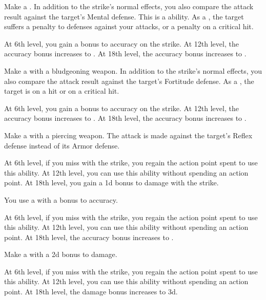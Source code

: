 {             Make a .
            In addition to the strike's normal effects, you also compare the attack result against the target's Mental defense.
            This is a  ability.
            As a , the target suffers a  penalty to defenses against your attacks, or a  penalty on a critical hit.
            \par At 6th level, you gain a  bonus to accuracy on the strike.
            At 12th level, the accuracy bonus increases to .
            At 18th level, the accuracy bonus increases to .

             Make a  with a bludgeoning weapon.
            In addition to the strike's normal effects, you also compare the attack result against the target's Fortitude defense.
            As a , the target is \sickened on a hit or \nauseated on a critical hit.
            \par At 6th level, you gain a  bonus to accuracy on the strike.
            At 12th level, the accuracy bonus increases to .
            At 18th level, the accuracy bonus increases to .

             Make a  with a piercing weapon.
            The attack is made against the target's Reflex defense instead of its Armor defense.
            \par At 6th level, if you miss with the strike, you regain the action point spent to use this ability.
            At 12th level, you can use this ability without spending an action point.
            At 18th level, you gain a \plus1d bonus to damage with the strike.

             You use a  with a  bonus to accuracy.
            \par At 6th level, if you miss with the strike, you regain the action point spent to use this ability.
            At 12th level, you can use this ability without spending an action point.
            At 18th level, the accuracy bonus increases to .

             Make a  with a \plus2d bonus to damage.
            \par At 6th level, if you miss with the strike, you regain the action point spent to use this ability.
            At 12th level, you can use this ability without spending an action point.
            At 18th level, the damage bonus increases to \plus3d.

}
